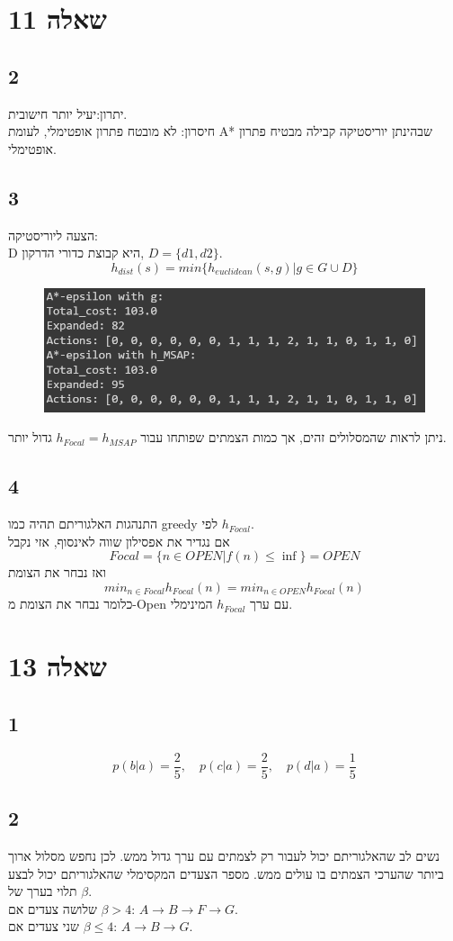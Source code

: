 \documentclass{article}
\begin{document}
\section{שאלה 11}
\subsection*{2}
יתרון:יעיל יותר חישובית.\\
חיסרון: לא מובטח פתרון אופטימלי, לעומת A* שבהינתן יוריסטיקה קבילה מבטיח פתרון אופטימלי.
\subsection*{3}
הצעה ליוריסטיקה:\\
D
היא קבוצת כדורי הדרקון,
$D = \{d1, d2\}$.
$$h_{dist}(s) = min\{h_{euclidean}(s,g)| g \in G \cup D\}$$
\begin{figure}[H]
	\includegraphics[scale=0.5]{11_3}
\end{figure}
ניתן לראות שהמסלולים זהים, אך כמות הצמתים שפותחו עבור
$h_{Focal}=h_{MSAP}$
גדול יותר.
\subsection*{4}
התנהגות האלגוריתם תהיה כמו greedy לפי 
$h_{Focal}$.\\
אם נגדיר את אפסילון שווה לאינסוף, אזי נקבל
$$Focal = \{n\in OPEN | f(n) \leq \inf\} = OPEN$$ 
ואז נבחר את הצומת
$$min_{n \in Focal} h_{Focal}(n) = min_{n \in OPEN} h_{Focal}(n)$$
כלומר נבחר את הצומת מ-Open עם ערך 
$h_{Focal}$
המינימלי.
\section{שאלה 13}
\subsection*{1}
$$p(b|a) = \frac{2}{5}, \quad p(c|a) = \frac{2}{5}, \quad p(d|a) = \frac{1}{5}$$
\subsection*{2}
נשים לב שהאלגוריתם יכול לעבור רק לצמתים עם ערך גדול ממש. לכן נחפש מסלול ארוך ביותר שהערכי הצמתים בו עולים ממש.
מספר הצעדים המקסימלי שהאלגוריתם יכול לבצע תלוי בערך של 
$\beta$.\\
שלושה צעדים אם 
$\beta > 4$:
$A \rightarrow B \rightarrow F \rightarrow G$.\\
שני צעדים אם 
$\beta \leq 4$:
$A \rightarrow B \rightarrow G$.
\end{document}
